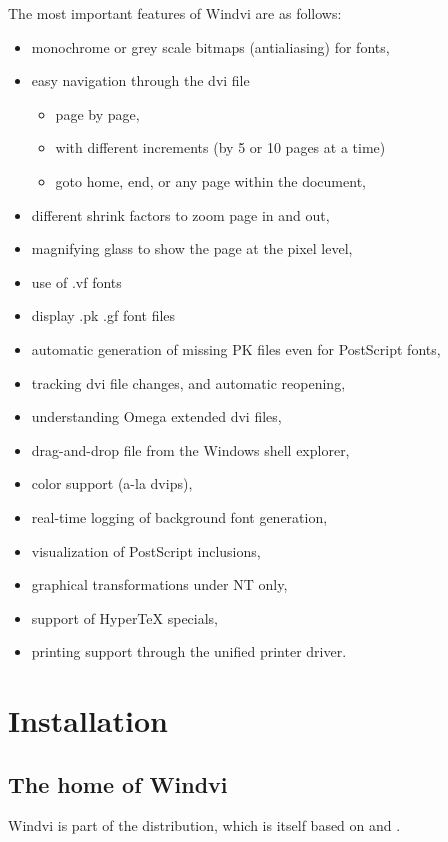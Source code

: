 \documentclass[a4paper,11pt]{article}
\def\WDVI{\textsf{Windvi}}
\begin{document}
The most important features of \WDVI{} are as follows:
\begin{itemize}
\item monochrome or grey scale bitmaps (antialiasing) for fonts, 
\item easy navigation through the dvi file
  \begin{itemize}
  \item page by page,
  \item with different increments (by 5 or 10 pages at a time)
  \item goto home, end, or any page within the document,
  \end{itemize}
\item different shrink factors to zoom page in and out,
\item magnifying glass to show the page at the pixel level,
\item use of .vf fonts
\item display .pk .gf font files
\item automatic generation of missing PK files even for PostScript fonts,
\item tracking dvi file changes, and automatic reopening,
\item understanding Omega extended dvi files,
\item drag-and-drop file from the Windows shell explorer,
\item color support (a-la dvips),
\item real-time logging of background font generation,
\item visualization of PostScript inclusions,
\item graphical transformations under NT only,
\item support of Hyper\TeX{} specials,
\item printing support through the unified printer driver.
\end{itemize}

\section{Installation}

\subsection{The home of Windvi}

Windvi is part of the \fptex distribution, which is itself based on
\tetex and \webc.
\end{document}
